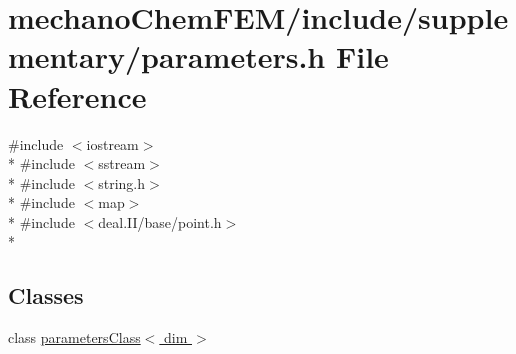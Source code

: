 \section{mechano\-Chem\-F\-E\-M/include/supplementary/parameters.h File Reference}
\label{parameters_8h}
{\ttfamily \#include $<$iostream$>$}\\*
{\ttfamily \#include $<$sstream$>$}\\*
{\ttfamily \#include $<$string.\-h$>$}\\*
{\ttfamily \#include $<$map$>$}\\*
{\ttfamily \#include $<$deal.\-I\-I/base/point.\-h$>$}\\*
\subsection*{Classes}
\begin{DoxyCompactItemize}
\item 
class \hyperlink{classparameters_class}{parameters\-Class$<$ dim $>$}
\end{DoxyCompactItemize}
